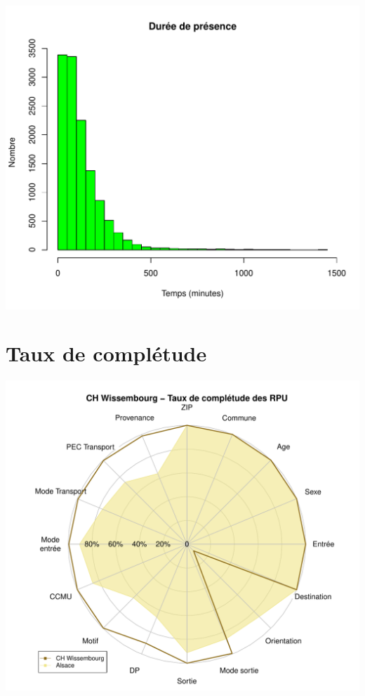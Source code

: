 \documentclass[12pt,english,french,twoside]{book}\usepackage[]{graphicx}\usepackage[]{color}
\makeatletter
\def\maxwidth{ %
  \ifdim\Gin@nat@width>\linewidth
    \linewidth
  \else
    \Gin@nat@width
  \fi
}
\newenvironment{knitrout}{}{} %
\makeatother
\begin{document}
\begin{knitrout}
\color{fgcolor}
\includegraphics[width=\maxwidth]{figure/graphe_wis-1} 

\end{knitrout}

\section*{Taux de complétude}

\begin{knitrout}
\color{fgcolor}
\includegraphics[width=\maxwidth]{figure/compl_wis-1} 

\end{knitrout}
\end{document}
